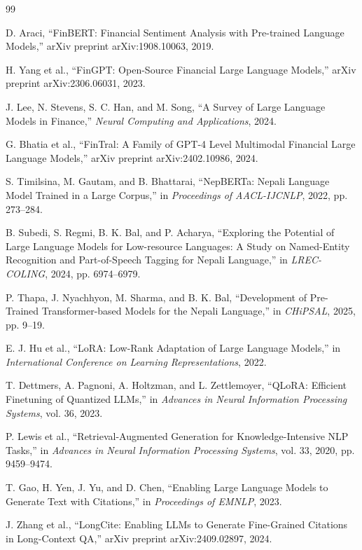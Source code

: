 \documentclass[12pt,a4paper]{report}
\begin{document}
\begingroup
\sloppy
\begin{thebibliography}{99}

D. Araci, ``FinBERT: Financial Sentiment Analysis with Pre-trained Language Models,'' arXiv preprint arXiv:1908.10063, 2019.

H. Yang et al., ``FinGPT: Open-Source Financial Large Language Models,'' arXiv preprint arXiv:2306.06031, 2023.

J. Lee, N. Stevens, S. C. Han, and M. Song, ``A Survey of Large Language Models in Finance,'' \emph{Neural Computing and Applications}, 2024.

G. Bhatia et al., ``FinTral: A Family of GPT-4 Level Multimodal Financial Large Language Models,'' arXiv preprint arXiv:2402.10986, 2024.

S. Timilsina, M. Gautam, and B. Bhattarai, ``NepBERTa: Nepali Language Model Trained in a Large Corpus,'' in \emph{Proceedings of AACL-IJCNLP}, 2022, pp. 273--284.

B. Subedi, S. Regmi, B. K. Bal, and P. Acharya, ``Exploring the Potential of Large Language Models for Low-resource Languages: A Study on Named-Entity Recognition and Part-of-Speech Tagging for Nepali Language,'' in \emph{LREC-COLING}, 2024, pp. 6974--6979.

P. Thapa, J. Nyachhyon, M. Sharma, and B. K. Bal, ``Development of Pre-Trained Transformer-based Models for the Nepali Language,'' in \emph{CHiPSAL}, 2025, pp. 9--19.

E. J. Hu et al., ``LoRA: Low-Rank Adaptation of Large Language Models,'' in \emph{International Conference on Learning Representations}, 2022.

T. Dettmers, A. Pagnoni, A. Holtzman, and L. Zettlemoyer, ``QLoRA: Efficient Finetuning of Quantized LLMs,'' in \emph{Advances in Neural Information Processing Systems}, vol. 36, 2023.

P. Lewis et al., ``Retrieval-Augmented Generation for Knowledge-Intensive NLP Tasks,'' in \emph{Advances in Neural Information Processing Systems}, vol. 33, 2020, pp. 9459--9474.

T. Gao, H. Yen, J. Yu, and D. Chen, ``Enabling Large Language Models to Generate Text with Citations,'' in \emph{Proceedings of EMNLP}, 2023.

J. Zhang et al., ``LongCite: Enabling LLMs to Generate Fine-Grained Citations in Long-Context QA,'' arXiv preprint arXiv:2409.02897, 2024.


\end{thebibliography}
\end{document}
